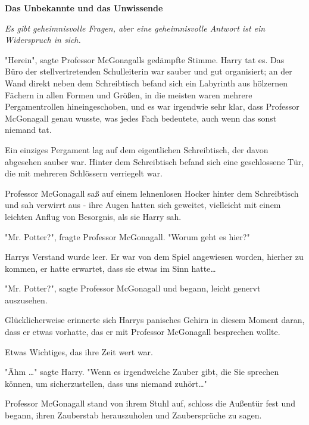 

\hypertarget{das-unbekannte-und-das-unwissende}{%

\textbf{Das Unbekannte und das Unwissende}

\emph{Es gibt geheimnisvolle Fragen, aber eine geheimnisvolle Antwort ist ein Widerspruch in sich.}

"Herein", sagte Professor McGonagalls gedämpfte Stimme. Harry tat es. Das Büro der stellvertretenden Schulleiterin war sauber und gut organisiert; an der Wand direkt neben dem Schreibtisch befand sich ein Labyrinth aus hölzernen Fächern in allen Formen und Größen, in die meisten waren mehrere Pergamentrollen hineingeschoben, und es war irgendwie sehr klar, dass Professor McGonagall genau wusste, was jedes Fach bedeutete, auch wenn das sonst niemand tat.

Ein einziges Pergament lag auf dem eigentlichen Schreibtisch, der davon abgesehen sauber war. Hinter dem Schreibtisch befand sich eine geschlossene Tür, die mit mehreren Schlössern verriegelt war.

Professor McGonagall saß auf einem lehnenlosen Hocker hinter dem Schreibtisch und sah verwirrt aus - ihre Augen hatten sich geweitet, vielleicht mit einem leichten Anflug von Besorgnis, als sie Harry sah.

"Mr. Potter?", fragte Professor McGonagall. "Worum geht es hier?"

Harrys Verstand wurde leer. Er war von dem Spiel angewiesen worden, hierher zu kommen, er hatte erwartet, dass sie etwas im Sinn hatte…

"Mr. Potter?", sagte Professor McGonagall und begann, leicht genervt auszusehen.

Glücklicherweise erinnerte sich Harrys panisches Gehirn in diesem Moment daran, dass er etwas vorhatte, das er mit Professor McGonagall besprechen wollte.

Etwas Wichtiges, das ihre Zeit wert war.

"Ähm …" sagte Harry. "Wenn es irgendwelche Zauber gibt, die Sie sprechen können, um sicherzustellen, dass uns niemand zuhört…"

Professor McGonagall stand von ihrem Stuhl auf, schloss die Außentür fest und begann, ihren Zauberstab herauszuholen und Zaubersprüche zu sagen.

}
